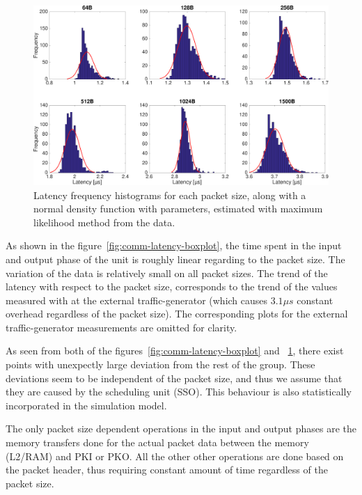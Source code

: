 \begin{figure}[]
  \begin{center}
    \includegraphics[width=\textwidth]{images/comm-latency-histograms.pdf}
    \caption{Latency frequency histograms for each packet size, along with a normal density function with parameters, estimated with maximum likelihood method from the data.}
    \label{fig:comm-latency-histograms}
  \end{center}
\end{figure}

As shown in the figure~\ref{fig:comm-latency-boxplot}, the time spent in the input and output phase of the unit is roughly linear regarding to the packet size. The variation of the data is relatively small on all packet sizes. The trend of the latency with respect to the packet size, corresponds to the trend of the values measured with at the external traffic-generator (which causes $3.1\mu s$ constant overhead regardless of the packet size). The corresponding plots for the external traffic-generator measurements are omitted for clarity.

As seen from both of the figures~\ref{fig:comm-latency-boxplot} and ~\ref{fig:comm-latency-histograms}, there exist points with unexpectly large deviation from the rest of the group. These deviations seem to be independent of the packet size, and thus we assume that they are caused by the scheduling unit (SSO). This behaviour is also statistically incorporated in the simulation model.

The only packet size dependent operations in the input and output phases are the memory transfers done for the actual packet data between the memory (L2/RAM) and PKI or PKO. All the other other operations are done based on the packet header, thus requiring constant amount of time regardless of the packet size.

